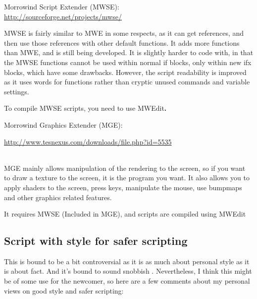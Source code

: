 \documentclass[
]{article}
\begin{document}
Morrowind Script Extender (MWSE):\\
\url{http://sourceforge.net/projects/mwse/}

MWSE is fairly similar to MWE in some respects, as it can get
references, and then use those references with other default functions.
It adds more functions than MWE, and is still being developed. It is
slightly harder to code with, in that the MWSE functions cannot be used
within normal if blocks, only within new ifx blocks, which have some
drawbacks. However, the script readability is improved as it uses words
for functions rather than cryptic unused commands and variable settings.

To compile MWSE scripts, you need to use MWEdit\textbf{.}

Morrowind Graphics Extender (MGE):

\url{http://www.tesnexus.com/downloads/file.php?id=5535}\strut \\
MGE mainly allows manipulation of the rendering to the screen, so if you
want to draw a texture to the screen, it is the program you want. It
also allows you to apply shaders to the screen, press keys, manipulate
the mouse, use bumpmaps and other graphics related features.

It requires MWSE (Included in MGE), and scripts are compiled using
MWEdit

\hypertarget{script-with-style-for-safer-scripting}{%
\subsection{Script with style for safer
scripting}\label{script-with-style-for-safer-scripting}}

This is bound to be a bit controversial as it is as much about personal
style as it is about fact. And it's bound to sound snobbish .
Nevertheless, I think this might be of some use for the newcomer, so
here are a few comments about my personal views on good style and safer
scripting:
\end{document}
